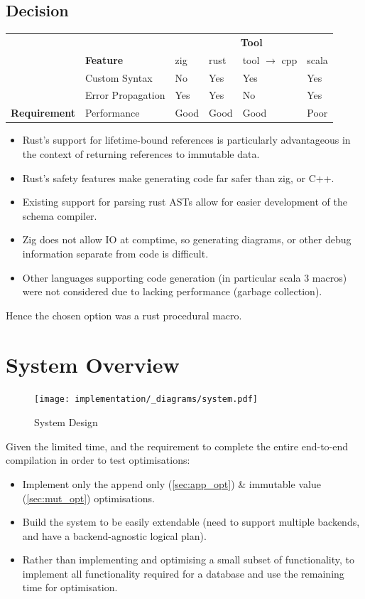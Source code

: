 \subsection{Decision}
\begin{center}
    \begin{tabular}{l l | l l l l}
        & & \multicolumn{4}{c}{\textbf{Tool}} \\
        & \textbf{Feature}                         & zig  & rust & tool $\to$ cpp & scala \\
        \hline
        & Custom Syntax     & No   & Yes  & Yes            & Yes   \\
        & Error Propagation & Yes  & Yes  & No             & Yes   \\
        \textbf{Requirement} & Performance       & Good & Good & Good           & Poor  \\
    \end{tabular}
\end{center}
\begin{itemize}
    \setlength\itemsep{0em}
    \item Rust's support for lifetime-bound references is particularly advantageous in the context of returning references to immutable data.
    \item Rust's safety features make generating code far safer than zig, or C++.
    \item Existing support for parsing rust ASTs allow for easier development of the schema compiler.
    \item Zig does not allow IO at comptime, so generating diagrams, or other debug information separate from code is difficult.
    \item Other languages supporting code generation (in particular scala 3 macros) were not considered due to lacking performance (garbage collection).
\end{itemize}
Hence the chosen option was a rust procedural macro.

\section{System Overview}
\begin{figure}[h!]
    \centering
    \texttt{[image: implementation/\_diagrams/system.pdf]}
    \caption{System Design}
\end{figure}
\noindent
Given the limited time, and the requirement to complete the entire end-to-end compilation in order to test optimisations:
\begin{itemize}
    \setlength\itemsep{0em}
    \item Implement only the append only (\ref{sec:app_opt}) \& immutable value (\ref{sec:mut_opt}) optimisations.
    \item Build the system to be easily extendable (need to support multiple backends, and have a backend-agnostic logical plan).
    \item Rather than implementing and optimising a small subset of functionality, to implement all functionality required for a database and use the remaining time for optimisation.
\end{itemize}


